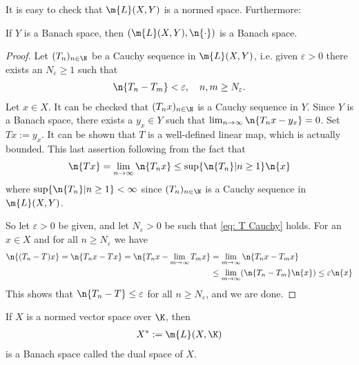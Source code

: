 It is easy to check that $\m{L}(X,Y)$ is a normed space. Furthermore:
\begin{theorem}
If $Y$ is a Banach space, then $(\m{L}(X, Y), \n{\cdot})$ is a Banach space.
\end{theorem}
\begin{proof}
Let $(T_{n})_{n\in \N}$ be a Cauchy sequence in $\m{L}(X,Y)$, i.e. given $\varepsilon > 0$ there exists an $N_{\varepsilon}\ge 1$ such that
\begin{align*}
	\n{T_{n}-T_{m}} < \varepsilon, \quad n,m\ge N_{\varepsilon}. \label{eq: T Cauchy}
\end{align*}
Let $x\in X$. It can be checked that $(T_{n}x)_{n\in \N}$ is a Cauchy sequence in $Y$. Since $Y$ is a Banach space, there exists a $y_{x}\in Y$ such that $\lim_{n\to \infty}\n{T_{n}x-y_{x}}=0$. Set $Tx:=y_{x}$. It can be shown that $T$ is a well-defined linear map, which is actually bounded. This last assertion following from the fact that
\begin{align*}
	\n{Tx} = \lim_{n\to \infty} \n{T_{n}x} \le \sup\{ \n{T_{n}} | n \ge 1 \} \n{x}
\end{align*}
where $\sup\{ \n{T_{n}} | n \ge 1 \}<\infty$ since $(T_{n})_{n\in \N}$ is a Cauchy sequence in $\m{L}(X,Y)$.

So let $\varepsilon > 0$ be given, and let $N_{\varepsilon}>0$ be such that \eqref{eq: T Cauchy} holds. For an $x\in X$ and for all $n\ge N_{\varepsilon}$ we have
\begin{align*}
	\n{(T_{n}-T)x} = \n{T_{n}x - Tx} = \n{T_{n}x - \lim_{m\to \infty} T_{m}x} &= \lim_{m\to \infty} \n{T_{n}x-T_{m}x} \\
	&\le \lim_{m\to \infty} (\n{T_{n}-T_{m}}\n{x}) \le \varepsilon \n{x}
\end{align*}
This shows that $\n{T_{n}-T}\le \varepsilon$ for all $n\ge N_{\varepsilon}$, and we are done.
\end{proof}

\begin{corollary}
If $X$ is a normed vector space over $\K$, then
\begin{align*}
	X^{*}:=\m{L}(X,\K)
\end{align*}
is a Banach space called the dual space of $X$.
\end{corollary}







